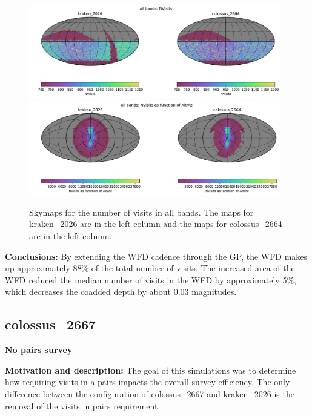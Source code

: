 \documentclass[DM,authoryear,toc]{lsstdoc}
\begin{document}
\begin{figure}[ht]
\centering
\includegraphics[width=0.98\textwidth]{figures/kraken_2026_colossus_2664_NVisits_all_bands_HEAL_ComboSkyMap.pdf}\\
\includegraphics[width=0.98\textwidth]{figures/kraken_2026_colossus_2664_Nvisits_as_function_of_Alt_Az_all_bands_HEAL_ComboSkyMap.pdf}
\caption{Skymaps for the number of visits in all bands. The maps for kraken\_2026 are in the left column and the maps for colossus\_2664 are
in the left column.}
\label{fig:nvisits-2664}
\end{figure}

\textbf{Conclusions:} By extending the WFD cadence through the GP, the WFD makes up approximately 88$\%$ of the total number of visits.
The increased area of the WFD reduced the median number of visits in the WFD by approximately 5$\%$, which decreases the coadded depth
by about 0.03 magnitudes.

\subsection{colossus\_2667} \label{colossus2667}

\textbf{No pairs survey}

\textbf{Motivation and description:} The goal of this simulations was to determine how requiring visits in a pairs
impacts the overall survey efficiency. The only difference between the configuration of colossus\_2667
and kraken\_2026 is the removal of the visits in pairs requirement.
\end{document}
